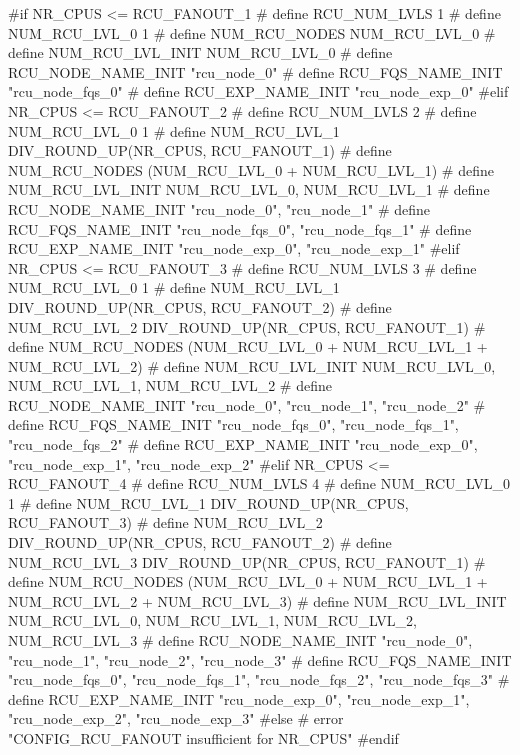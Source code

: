 \begin{fcvlabel}
\begin{VerbatimN}[breaklines=true,xleftmargin=1pt,xrightmargin=0pt,commandchars=\%\@\$]
	#if NR_CPUS <= RCU_FANOUT_1       %
	#  define RCU_NUM_LVLS        1         %
	#  define NUM_RCU_LVL_0        1        %
	#  define NUM_RCU_NODES        NUM_RCU_LVL_0
	#  define NUM_RCU_LVL_INIT    { NUM_RCU_LVL_0 }
	#  define RCU_NODE_NAME_INIT  { "rcu_node_0" }  %
	#  define RCU_FQS_NAME_INIT   { "rcu_node_fqs_0" }
	#  define RCU_EXP_NAME_INIT   { "rcu_node_exp_0" }  %
	#elif NR_CPUS <= RCU_FANOUT_2
	#  define RCU_NUM_LVLS        2         %
	#  define NUM_RCU_LVL_0        1        %
	#  define NUM_RCU_LVL_1        DIV_ROUND_UP(NR_CPUS, RCU_FANOUT_1) %
	#  define NUM_RCU_NODES        (NUM_RCU_LVL_0 + NUM_RCU_LVL_1)
	#  define NUM_RCU_LVL_INIT    { NUM_RCU_LVL_0, NUM_RCU_LVL_1 }
	#  define RCU_NODE_NAME_INIT  { "rcu_node_0", "rcu_node_1" } %
	#  define RCU_FQS_NAME_INIT   { "rcu_node_fqs_0", "rcu_node_fqs_1" }
	#  define RCU_EXP_NAME_INIT   { "rcu_node_exp_0", "rcu_node_exp_1" } %
	#elif NR_CPUS <= RCU_FANOUT_3
	#  define RCU_NUM_LVLS        3         %
	#  define NUM_RCU_LVL_0        1        %
	#  define NUM_RCU_LVL_1        DIV_ROUND_UP(NR_CPUS, RCU_FANOUT_2) %
	#  define NUM_RCU_LVL_2        DIV_ROUND_UP(NR_CPUS, RCU_FANOUT_1) %
	#  define NUM_RCU_NODES        (NUM_RCU_LVL_0 + NUM_RCU_LVL_1 + NUM_RCU_LVL_2)
	#  define NUM_RCU_LVL_INIT    { NUM_RCU_LVL_0, NUM_RCU_LVL_1, NUM_RCU_LVL_2 }
	#  define RCU_NODE_NAME_INIT  { "rcu_node_0", "rcu_node_1", "rcu_node_2" } %
	#  define RCU_FQS_NAME_INIT   { "rcu_node_fqs_0", "rcu_node_fqs_1", "rcu_node_fqs_2" }
	#  define RCU_EXP_NAME_INIT   { "rcu_node_exp_0", "rcu_node_exp_1", "rcu_node_exp_2" } %
	#elif NR_CPUS <= RCU_FANOUT_4
	#  define RCU_NUM_LVLS        4         %
	#  define NUM_RCU_LVL_0        1        %
	#  define NUM_RCU_LVL_1        DIV_ROUND_UP(NR_CPUS, RCU_FANOUT_3) %
	#  define NUM_RCU_LVL_2        DIV_ROUND_UP(NR_CPUS, RCU_FANOUT_2)
	#  define NUM_RCU_LVL_3        DIV_ROUND_UP(NR_CPUS, RCU_FANOUT_1) %
	#  define NUM_RCU_NODES        (NUM_RCU_LVL_0 + NUM_RCU_LVL_1 + NUM_RCU_LVL_2 + NUM_RCU_LVL_3)
	#  define NUM_RCU_LVL_INIT    { NUM_RCU_LVL_0, NUM_RCU_LVL_1, NUM_RCU_LVL_2, NUM_RCU_LVL_3 }
	#  define RCU_NODE_NAME_INIT  { "rcu_node_0", "rcu_node_1", "rcu_node_2", "rcu_node_3" } %
	#  define RCU_FQS_NAME_INIT   { "rcu_node_fqs_0", "rcu_node_fqs_1", "rcu_node_fqs_2", "rcu_node_fqs_3" }
	#  define RCU_EXP_NAME_INIT   { "rcu_node_exp_0", "rcu_node_exp_1", "rcu_node_exp_2", "rcu_node_exp_3" }  %
	#else         %
	# error "CONFIG_RCU_FANOUT insufficient for NR_CPUS"
	#endif        %
\end{VerbatimN}
\end{fcvlabel}

